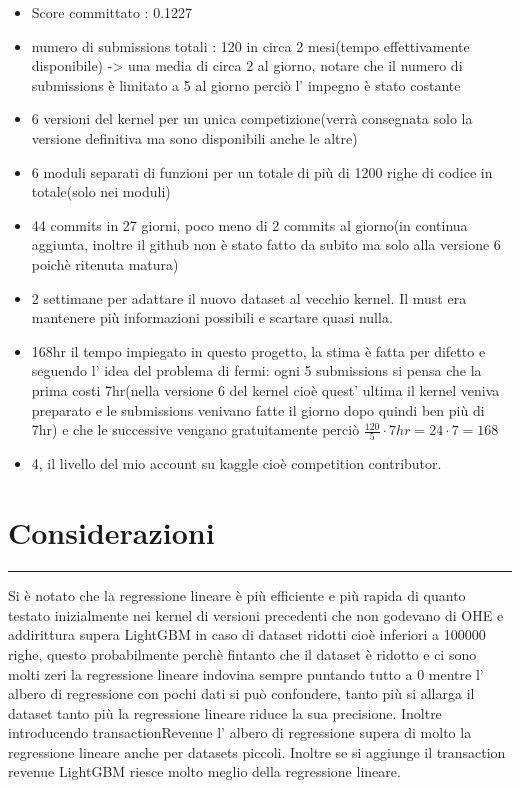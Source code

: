 \documentclass[11pt]{article}
\begin{document}
\begin{itemize}
\item
  Score committato : 0.1227
\item
  numero di submissions totali : 120 in circa 2 mesi(tempo
  effettivamente disponibile) -\textgreater{} una media di circa 2 al
  giorno, notare che il numero di submissions è limitato a 5 al giorno
  perciò l' impegno è stato costante
\item
  6 versioni del kernel per un unica competizione(verrà consegnata solo
  la versione definitiva ma sono disponibili anche le altre)
\item
  6 moduli separati di funzioni per un totale di più di 1200 righe di
  codice in totale(solo nei moduli)
\item
  44 commits in 27 giorni, poco meno di 2 commits al giorno(in continua
  aggiunta, inoltre il github non è stato fatto da subito ma solo alla
  versione 6 poichè ritenuta matura)
\item
  2 settimane per adattare il nuovo dataset al vecchio kernel. Il must
  era mantenere più informazioni possibili e scartare quasi nulla.
\item
  168hr il tempo impiegato in questo progetto, la stima è fatta per
  difetto e seguendo l' idea del problema di fermi: ogni 5 submissions
  si pensa che la prima costi 7hr(nella versione 6 del kernel cioè
  quest' ultima il kernel veniva preparato e le submissions venivano
  fatte il giorno dopo quindi ben più di 7hr) e che le successive
  vengano gratuitamente perciò
  \(\frac{120}{5}\cdot 7hr = 24 \cdot 7 = 168\)
\item
  4, il livello del mio account su kaggle cioè competition contributor.
\end{itemize}

    \section{Considerazioni}\label{considerazioni}

\begin{center}\rule{0.5\linewidth}{\linethickness}\end{center}

Si è notato che la regressione lineare è più efficiente e più rapida di
quanto testato inizialmente nei kernel di versioni precedenti che non
godevano di OHE e addirittura supera LightGBM in caso di dataset ridotti
cioè inferiori a 100000 righe, questo probabilmente perchè fintanto che
il dataset è ridotto e ci sono molti zeri la regressione lineare
indovina sempre puntando tutto a 0 mentre l' albero di regressione con
pochi dati si può confondere, tanto più si allarga il dataset tanto più
la regressione lineare riduce la sua precisione. Inoltre introducendo
transactionRevenue l' albero di regressione supera di molto la
regressione lineare anche per datasets piccoli. Inoltre se si aggiunge
il transaction revenue LightGBM riesce molto meglio della regressione
lineare.
\end{document}
